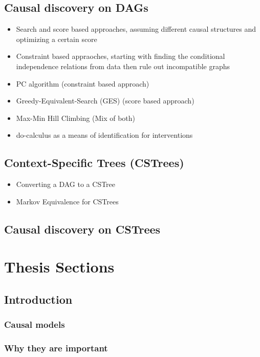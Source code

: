 \documentclass[11pt]{article}
\begin{document}
\subsection{Causal discovery on DAGs}
\label{sec:org81de1ee}
\begin{itemize}
\item Search and score based approaches, assuming different causal structures and optimizing a certain score
\item Constraint based appraoches, starting with finding  the conditional independence relations from data then rule out incompatible graphs
\item PC algorithm (constraint based approach)
\item Greedy-Equivalent-Search (GES) (score based approach)
\item Max-Min Hill Climbing  (Mix of both)
\item do-calculus as a means of identification for interventions
\end{itemize}
\subsection{Context-Specific Trees (CSTrees)}
\label{sec:org894d649}
\begin{itemize}
\item Converting a DAG to a CSTree
\item Markov Equivalence for CSTrees
\end{itemize}
\subsection{Causal discovery on CSTrees}
\label{sec:orgeb9458e}

\section{Thesis Sections}
\label{sec:orgbd6c8e6}
\subsection{Introduction}
\label{sec:org3e7a33a}
\subsubsection{Causal models}
\label{sec:org5e62f0c}
\subsubsection{Why they are important}
\label{sec:orgc4673c7}
\end{document}
